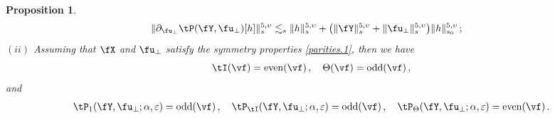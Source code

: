 \documentclass[a4paper,reqno,10pt]{article}
\newtheorem{pro}{Proposition}[section]
\newcommand{\pa}{\partial}
\begin{document}
\begin{pro}
\begin{equation}
\begin{aligned}
					\| \pa_{\fu_{\perp}}\tP(\fY,\fu_{\perp})[h] \|_{s}^{5,\upsilon} &\lesssim_{s} \| h \|_{s}^{5,\upsilon}+  \big(  \| \fY\|_{s}^{5,\upsilon} + \| \fu_{\perp}\|_{s}^{5,\upsilon} \big) \| h \|_{s_0}^{5,\upsilon} \,;
	\end{aligned}
	\end{equation}
	\noindent $(ii)$ Assuming that  $\fX$ and  $\fu_{\perp}$ satisfy the symmetry properties \eqref{parities.1}, then we have
	\begin{equation}\label{parity.AA}
		\tI(\vf)={\rm even}(\vf) \,, \quad \Theta(\vf)={\rm odd}(\vf) \,,
	\end{equation}
	and
	\begin{align}
		\tP_{1}(\fY,\fu_{\perp};\alpha,\varepsilon)= {\rm odd}(\vf) \,, \quad	\tP_{\tI}(\fY,\fu_{\perp};\alpha,\varepsilon)= {\rm odd}(\vf)\,, \quad		\tP_{\Theta}(\fY,\fu_{\perp};\alpha,\varepsilon)=  {\rm even}(\vf) \,.
	\end{align}
\end{pro}
\end{document}
